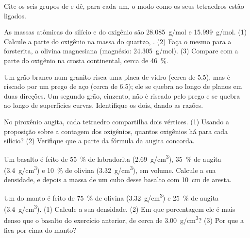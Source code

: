 \begin{exercise}[$\star$]\label{exo:g11:minerals:5}
Cite os seis grupos de  e dê, para cada um, o
modo como os seus tetraedros estão ligados.
\end{exercise}

\begin{exercise}[$\star\star$]\label{exo:g11:minerals:6}
As massas atômicas do silício e do oxigênio são \qty{28.085}{g/mol} e
\qty{15.999}{g/mol}. (1) Calcule a parte do oxigênio na massa do quartzo,
. (2) Faça o mesmo para a forsterita, a olivina magnesiana
 (magnésio: \qty{24.305}{g/mol}). (3) Compare com a parte do
oxigênio na crosta continental, cerca de \qty{46}{\percent}.
\end{exercise}

\begin{exercise}[$\star\star$]\label{exo:g11:minerals:7}
Um grão branco num granito risca uma placa de vidro (cerca de 5.5), mas é
riscado por um prego de aço (cerca de 6.5); ele se quebra ao longo de
planos em duas direções. Um segundo grão, cinzento, não é riscado pelo prego
e se quebra ao longo de superfícies curvas. Identifique os dois, dando as
razões.
\end{exercise}

\begin{exercise}[$\star\star$]\label{exo:g11:minerals:8}
No piroxênio augita, cada tetraedro compartilha dois vértices. (1) Usando a
proposição sobre a contagem dos oxigênios, quantos oxigênios há para cada
silício? (2) Verifique que a parte  da fórmula da augita
concorda.
\end{exercise}

\begin{exercise}[$\star\star$]\label{exo:g11:minerals:9}
Um basalto é feito de \qty{55}{\percent} de labradorita (\qty{2.69}{g/cm^3}),
\qty{35}{\percent} de augita (\qty{3.4}{g/cm^3}) e \qty{10}{\percent} de
olivina (\qty{3.32}{g/cm^3}), em volume. Calcule a sua densidade, e depois a
massa de um cubo desse basalto com \qty{10}{cm} de aresta.
\end{exercise}

\begin{exercise}[$\star\star$]\label{exo:g11:minerals:10}
Um  do manto é feito de \qty{75}{\percent} de olivina
(\qty{3.32}{g/cm^3}) e \qty{25}{\percent} de augita (\qty{3.4}{g/cm^3}).
(1) Calcule a sua densidade. (2) Em que porcentagem ele é mais denso que o
basalto do exercício anterior, de cerca de \qty{3.00}{g/cm^3}? (3) Por que a
 fica por cima do manto?
\end{exercise}

